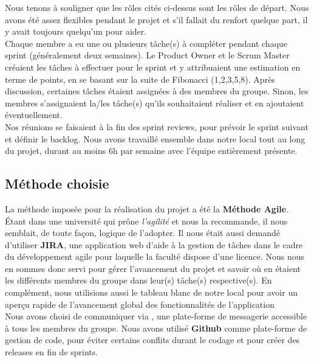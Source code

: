 \documentclass[t, 12pt, usenames,dvipsnames]{article}
\begin{document}
            \noindent Nous tenons à souligner que les rôles cités ci-dessus sont les rôles de départ. Nous avons été assez flexibles pendant le projet et s'il fallait du renfort quelque part, il y avait toujours quelqu'un pour aider. \\
            Chaque membre a eu une ou plusieurs tâche(s) à compléter pendant chaque sprint (généralement deux semaines). Le Product Owner et le Scrum Master créaient les tâches à effectuer pour le sprint et y attribuaient une estimation en terme de points, en se basant sur la suite de Fibonacci (1,2,3,5,8). Après discussion, certaines tâches étaient assignées à des membres du groupe. Sinon, les membres s'assignaient la/les tâche(s) qu'ils souhaitaient réaliser et en ajoutaient éventuellement.\\
            Nos réunions se faisaient à la fin des sprint reviews, pour prévoir le sprint suivant et définir le backlog. Nous avons travaillé ensemble dans notre local tout au long du projet, durant au moins 6h par semaine avec l'équipe entièrement présente.
            
        \subsection{Méthode choisie}
            \noindent La méthode imposée pour la réalisation du projet a été la \textbf{Méthode Agile}. Étant dans une université qui prône \textit{l'agilité} et nous la recommande, il nous semblait, de toute façon, logique de l'adopter. Il nous était aussi demandé d'utiliser \textbf{JIRA}, une application web d'aide à la gestion de tâches dans le cadre du développement agile pour laquelle la faculté dispose d'une licence. Nous nous en sommes donc servi pour gérer l'avancement du projet et savoir où en étaient les différents membres du groupe dans leur(s) tâche(s) respective(s). En complément, nous utilisions aussi le tableau blanc de notre local pour avoir un aperçu rapide de l'avancement global des fonctionnalités de l'application \\
            Nous avons choisi de communiquer via , une plate-forme de messagerie accessible à tous les membres du groupe. Nous avons utilisé \textbf{Github} comme plate-forme de gestion de code, pour éviter certains conflits durant le codage et pour créer des releases en fin de sprints.\\
            
\end{document}
